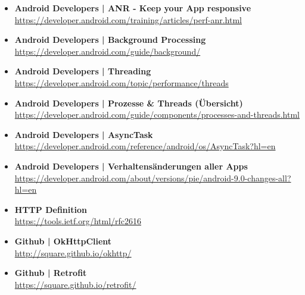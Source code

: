 \documentclass[a4paper]{article}
\begin{document}
		\begin{itemize}
			
			\item \textbf{Android Developers | ANR - Keep your App responsive}\\
			\href{https://developer.android.com/training/articles/perf-anr.html}
			{https://developer.android.com/training/articles/perf-anr.html}
			
			\item \textbf{Android Developers | Background Processing}\\
			\href{https://developer.android.com/guide/background/}
			{https://developer.android.com/guide/background/}
			
			\item \textbf{Android Developers | Threading}\\
			\href{https://developer.android.com/topic/performance/threads}
			{https://developer.android.com/topic/performance/threads}
			
			\item \textbf{Android Developers | Prozesse \& Threads (Übersicht)}\\
			\href{https://developer.android.com/guide/components/processes-and-threads.html}
			{https://developer.android.com/guide/components/processes-and-threads.html}
			
			\item \textbf{Android Developers | AsyncTask}\\
			\href{https://developer.android.com/reference/android/os/AsyncTask?hl=en}
			{https://developer.android.com/reference/android/os/AsyncTask?hl=en}
			
			\item \textbf{Android Developers | Verhaltensänderungen aller Apps}\\
			\href{https://developer.android.com/about/versions/pie/android-9.0-changes-all?hl=en}
			{https://developer.android.com/about/versions/pie/android-9.0-changes-all?hl=en}
			
			\item \textbf{HTTP Definition}\\
			\href{https://tools.ietf.org/html/rfc2616}
			{https://tools.ietf.org/html/rfc2616}
			
			\item \textbf{Github | OkHttpClient}\\
			\href{http://square.github.io/okhttp/}
			{http://square.github.io/okhttp/}
			
			\item \textbf{Github | Retrofit}\\
			\href{https://square.github.io/retrofit/}
			{https://square.github.io/retrofit/}
			

\end{itemize}
\end{document}
